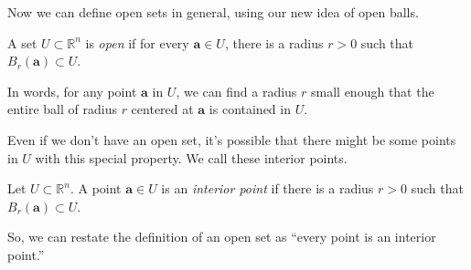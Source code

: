 \documentclass{ximera}
\begin{document}
Now we can define open sets in general, using our new idea of open balls.

\begin{definition}
A set $U\subset \mathbb{R}^n$ is \emph{open} if for every $\mathbf{a}\in U$, there is a radius $r>0$ such that $B_r(\mathbf{a})\subset U$.
\end{definition}

In words, for any point $\mathbf{a}$ in $U$, we can find a radius $r$ small enough that the entire ball of radius $r$ centered at $\mathbf{a}$ is contained in $U$.



Even if we don't have an open set, it's possible that there might be some points in $U$ with this special property. We call these interior points.

\begin{definition}
Let $U\subset \mathbb{R}^n$. A point $\mathbf{a}\in U$ is an \emph{interior point} if there is a radius $r>0$ such that $B_r(\mathbf{a})\subset U$.
\end{definition}

So, we can restate the definition of an open set as ``every point is an interior point.''
\end{document}
